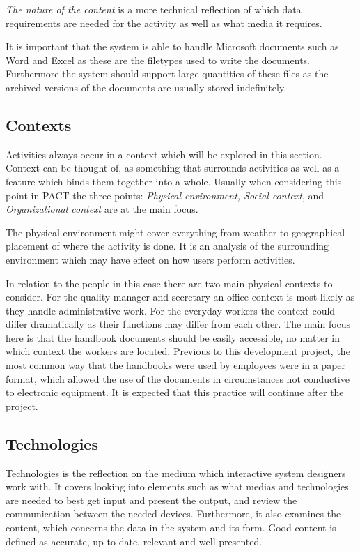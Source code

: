 \textit{The nature of the content} is a more technical reflection of which data requirements are needed for the activity as well as what media it requires.

It is important that the system is able to handle Microsoft documents such as Word and Excel as these are the filetypes used to write the documents.
Furthermore the system should support large quantities of these files as the archived versions of the documents are usually stored indefinitely.

\subsection{Contexts}
Activities always occur in a context which will be explored in this section.
Context can be thought of, as something that surrounds activities as well as a feature which binds them together into a whole.
Usually when considering this point in PACT the three points: \textit{Physical environment, Social context}, and \textit{Organizational context} are at the main focus.

The physical environment might cover everything from weather to geographical placement of where the activity is done.
It is an analysis of the surrounding environment which may have effect on how users perform activities.

In relation to the people in this case there are two main physical contexts to consider.
For the quality manager and secretary an office context is most likely as they handle administrative work.
For the everyday workers the context could differ dramatically as their functions may differ from each other.
The main focus here is that the handbook documents should be easily accessible, no matter in which context the workers are located.
Previous to this development project, the most common way that the handbooks were used by employees were in a paper format, which allowed the use of the documents in circumstances not conductive to electronic equipment.
It is expected that this practice will continue after the project.

\subsection{Technologies}
Technologies is the reflection on the medium which interactive system designers work with.
It covers looking into elements such as what medias and technologies are needed to best get input and present the output, and review the communication between the needed devices.
Furthermore, it also examines the content, which concerns the data in the system and its form.
Good content is defined as accurate, up to date, relevant and well presented.

